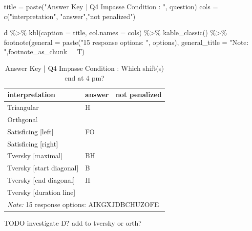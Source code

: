\documentclass[
  letterpaper,
  DIV=11,
  numbers=noendperiod]{scrreprt}
\newenvironment{Shaded}{\begin{snugshade}}{\end{snugshade}}
\newcommand{\AttributeTok}[1]{\textcolor[rgb]{0.40,0.45,0.13}{#1}}
\newcommand{\FunctionTok}[1]{\textcolor[rgb]{0.28,0.35,0.67}{#1}}
\newcommand{\NormalTok}[1]{\textcolor[rgb]{0.00,0.23,0.31}{#1}}
\newcommand{\OtherTok}[1]{\textcolor[rgb]{0.00,0.23,0.31}{#1}}
\newcommand{\SpecialCharTok}[1]{\textcolor[rgb]{0.37,0.37,0.37}{#1}}
\newcommand{\StringTok}[1]{\textcolor[rgb]{0.13,0.47,0.30}{#1}}
\begin{document}
\begin{Shaded}
\begin{Highlighting}[]
\NormalTok{title }\OtherTok{=} \FunctionTok{paste}\NormalTok{(}\StringTok{"Answer Key | Q4 Impasse Condition : "}\NormalTok{, question)}
\NormalTok{cols }\OtherTok{=} \FunctionTok{c}\NormalTok{(}\StringTok{"interpretation"}\NormalTok{, }\StringTok{"answer"}\NormalTok{,}\StringTok{"not penalized"}\NormalTok{)}

\NormalTok{d }\SpecialCharTok{\%\textgreater{}\%} \FunctionTok{kbl}\NormalTok{(}\AttributeTok{caption =}\NormalTok{ title, }\AttributeTok{col.names =}\NormalTok{ cols) }\SpecialCharTok{\%\textgreater{}\%} \FunctionTok{kable\_classic}\NormalTok{() }\SpecialCharTok{\%\textgreater{}\%} 
  \FunctionTok{footnote}\NormalTok{(}\AttributeTok{general =} \FunctionTok{paste}\NormalTok{(}\StringTok{"15 response options: "}\NormalTok{, options), }\AttributeTok{general\_title =} \StringTok{"Note: "}\NormalTok{,}\AttributeTok{footnote\_as\_chunk =}\NormalTok{ T) }
\end{Highlighting}
\end{Shaded}

\begin{table}

\caption{Answer Key | Q4 Impasse Condition :  Which shift(s) end at 4 pm?}
\centering
\begin{tabular}[t]{l|l|l}
\hline
interpretation & answer & not penalized\\
\hline
Triangular & H & \\
\hline
Orthgonal &  & \\
\hline
Satisficing [left] & FO & \\
\hline
Satisficing [right] &  & \\
\hline
Tversky [maximal] & BH & \\
\hline
Tversky [start diagonal] & B & \\
\hline
Tversky [end diagonal] & H & \\
\hline
Tversky [duration line] &  & \\
\hline
\multicolumn{3}{l}{\rule{0pt}{1em}\textit{Note: } 15 response options:  AIKGXJDBCHUZOFE}\\
\end{tabular}
\end{table}

TODO investigate D? add to tversky or orth?
\end{document}
